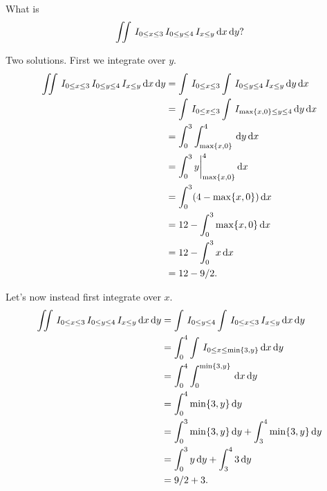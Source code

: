 \documentclass[lectures]{subfiles}
\begin{document}
\begin{exercise}
What is
\begin{align}
\label{eq:285}
\iint \,I_{0\leq x \leq 3} \,I_{0\leq y \leq 4}\,I_{x\leq y}\,\textrm{d}x \,\textrm{d}y?
\end{align}
\begin{solution}
Two solutions. First we integrate over $y$.
\begin{align}
\label{eq:385}
\iint \,I_{0\leq x \leq 3} \,I_{0\leq y \leq 4}\,I_{x\leq y}\,\textrm{d}x \,\textrm{d}y
&=\int \,I_{0\leq x \leq 3} \int \,I_{0\leq y \leq 4}\,I_{x\leq y}\,\textrm{d}y \,\textrm{d}x\\
&=\int \,I_{0\leq x \leq 3} \int \,I_{\max\{x, 0\} \leq y \leq 4}\,\textrm{d}y \,\textrm{d}x\\
&=\int_{0}^{3} \int_{\max\{x, 0\}}^{4}\,\textrm{d}y \,\textrm{d}x\\
&=\int_{0}^{3} y\biggr|_{\max\{x, 0\}}^{4} \,\textrm{d}x\\
&=\int_{0}^{3}  (4-\max\{x, 0\}) \,\textrm{d}x\\
&=12 - \int_{0}^{3} \max\{x, 0\} \,\textrm{d}x\\
&=12 - \int_{0}^{3} x  \,\textrm{d}x\\
&=12 - 9/2.
\end{align}

Let's now instead first integrate over $x$.
\begin{align}
\label{eq:485}
\iint \,I_{0\leq x \leq 3} \,I_{0\leq y \leq 4}\,I_{x\leq y}\,\textrm{d}x \,\textrm{d}y
&= \int \,I_{0\leq y \leq 4} \int \,I_{0\leq x \leq 3} \,I_{x\leq y}\,\textrm{d}x \,\textrm{d}y\\
&= \int_{0}^{4} \int \,I_{0\leq x \leq \min\{3, y\}}\,\textrm{d}x \,\textrm{d}y\\
&= \int_{0}^{4} \int_{0}^{\min\{3, y\}} \,\textrm{d}x \,\textrm{d}y\\
&= \int_{0}^{4} \min\{3, y\}\,\textrm{d}y\\
&= \int_{0}^{3} \min\{3, y\}\,\textrm{d}y + \int_{3}^{4} \min\{3, y\}\,\textrm{d}y\\
&= \int_{0}^{3} y \,\textrm{d}y + \int_{3}^{4}  3\,\textrm{d}y\\
&= 9/2 + 3.
\end{align}
\end{solution}
\end{exercise}
\end{document}
